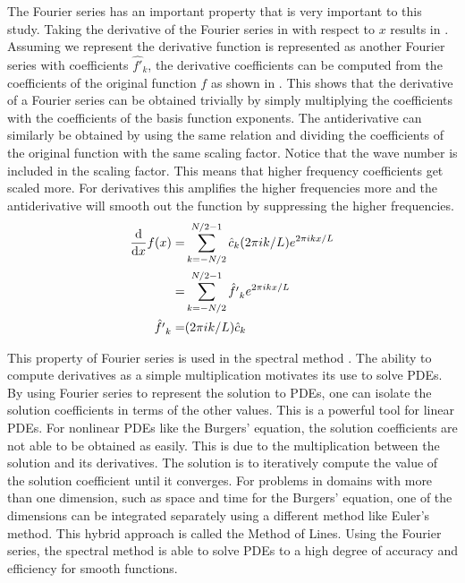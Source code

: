 The Fourier series has an important property that is very important to this study. Taking the derivative of the Fourier series in  with respect to \(x\) results in . Assuming we represent the derivative function is represented as another Fourier series with coefficients \(\hat{f'}_k\), the derivative coefficients can be computed from the coefficients of the original function \(f\) as shown in . This shows that the derivative of a Fourier series can be obtained trivially by simply multiplying the coefficients with the coefficients of the basis function exponents. The antiderivative can similarly be obtained by using the same relation and dividing the coefficients of the original function with the same scaling factor. Notice that the wave number is included in the scaling factor. This means that higher frequency coefficients get scaled more. For derivatives this amplifies the higher frequencies more and the antiderivative will smooth out the function by suppressing the higher frequencies.
\begin{align}
  \dv{x}f(x)=  & \sum_{k=-N/2}^{N/2-1} \hat{c}_k (2\pi ik/L) e^{2\pi ikx/L} \label{eq:fourier_series_complex_derivative} \\
  =            & \sum_{k=-N/2}^{N/2-1} \hat{f'}_k e^{2\pi ikx/L}\nonumber                                                \\
  \hat{f'}_k = & (2\pi ik/L)\hat{c}_k\label{eq:fourier_coeff_derivative}
\end{align}

This property of Fourier series is used in the spectral method \autocite{shenSpectralMethodsAlgorithms2011,boydChebyshevFourierSpectral2001}. The ability to compute derivatives as a simple multiplication motivates its use to solve PDEs. By using Fourier series to represent the solution to PDEs, one can isolate the solution coefficients in terms of the other values. This is a powerful tool for linear PDEs. For nonlinear PDEs like the Burgers' equation, the solution coefficients are not able to be obtained as easily. This is due to the multiplication between the solution and its derivatives. The solution is to iteratively compute the value of the solution coefficient until it converges. For problems in domains with more than one dimension, such as space and time for the Burgers' equation, one of the dimensions can be integrated separately using a different method like Euler's method. This hybrid approach is called the Method of Lines. Using the Fourier series, the spectral method is able to solve PDEs to a high degree of accuracy and efficiency for smooth functions.

